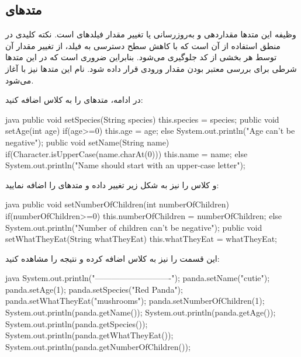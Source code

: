 \subsection{متدهای }

وظیفه این متدها مقداردهی و به‌روزرسانی یا تغییر مقدار فیلدهای
 است. نکته کلیدی در منطق استفاده از  آن
است که با کاهش سطح دسترسی به فیلد، از تغییر مقدار آن توسط هر بخشی از کد
جلوگیری می‌شود. بنابراین ضروری است که در این متدها شرطی برای بررسی معتبر
بودن مقدار ورودی قرار داده شود. نام این متدها نیز با 
آغاز می‌شود.

در ادامه، متدهای  را به کلاس  اضافه کنید:

\begin{codebox}{java}
public void setSpecies(String species) {
        this.species = species;
}
public void setAge(int age) {
    if(age>=0)
        this.age = age;
    else{
        System.out.println("Age can't be negative");
    }
}
public void setName(String name) {
    if(Character.isUpperCase(name.charAt(0)))
        this.name = name;
    else{
        System.out.println("Name should start with an upper-case letter");
    }
}
\end{codebox}

و کلاس  را نیز به شکل زیر تغییر داده و متدهای
 را اضافه نمایید:

\begin{codebox}{java}
public void setNumberOfChildren(int numberOfChildren) {
    if(numberOfChildren>=0)
        this.numberOfChildren = numberOfChildren;
    else{
        System.out.println("Number of children can't be negative");
    }
}
public void setWhatTheyEat(String whatTheyEat) {
    this.whatTheyEat = whatTheyEat;
}
\end{codebox}

این قسمت را نیز به کلاس  اضافه کرده و نتیجه را مشاهده
کنید:

\begin{codebox}{java}
        System.out.println("----------------------------");
        panda.setName("cutie");
        panda.setAge(1);
        panda.setSpecies("Red Panda");
        panda.setWhatTheyEat("mushrooms");
        panda.setNumberOfChildren(1);
        System.out.println(panda.getName());
        System.out.println(panda.getAge());
        System.out.println(panda.getSpecies());
        System.out.println(panda.getWhatTheyEat());
        System.out.println(panda.getNumberOfChildren());
\end{codebox}

